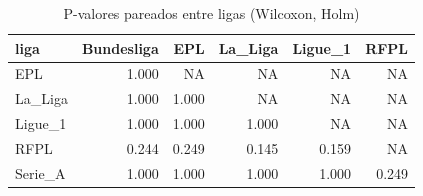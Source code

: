 \begin{table}

\caption{\label{tab:pareado_ligas_g20}P-valores pareados entre ligas (Wilcoxon, Holm)}
\centering
\begin{tabular}[t]{lrrrrr}
\toprule
liga & Bundesliga & EPL & La\_Liga & Ligue\_1 & RFPL\\
\midrule
EPL & 1.000 & NA & NA & NA & NA\\
La\_Liga & 1.000 & 1.000 & NA & NA & NA\\
Ligue\_1 & 1.000 & 1.000 & 1.000 & NA & NA\\
RFPL & 0.244 & 0.249 & 0.145 & 0.159 & NA\\
Serie\_A & 1.000 & 1.000 & 1.000 & 1.000 & 0.249\\
\bottomrule
\end{tabular}
\end{table}
